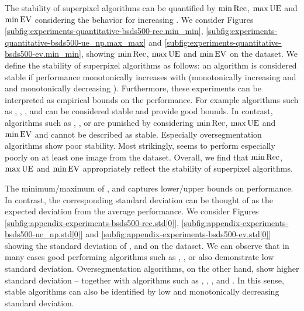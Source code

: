 The stability of superpixel algorithms can be quantified by $\min\text{Rec}$, $\max\text{UE}$ and $\min\text{EV}$ considering the behavior for increasing \K.
We consider Figures \ref{subfig:experiments-quantitative-bsds500-rec.min_min}, \ref{subfig:experiments-quantitative-bsds500-ue_np.max_max}
and \ref{subfig:experiments-quantitative-bsds500-ev.min_min},
showing $\min\text{Rec}$, $\max\text{UE}$ and $\min\text{EV}$ on the \BSDS dataset. We define the stability of superpixel algorithms
as follows: an algorithm is considered stable if performance monotonically increases with \K
(\ie monotonically increasing \Rec and \EV and monotonically decreasing \UE).
Furthermore, these experiments can be interpreted as empirical bounds on the performance.
For example algorithms such as \ETPSr, \ERGCr, \ERSr, \CRSr and \SLICr can be considered stable and provide good bounds.
In contrast, algorithms such as \EAMSr, \FHr, \VCr or \POISEr are punished by
considering $\min\text{Rec}$, $\max\text{UE}$ and $\min\text{EV}$ and cannot be described as stable.
Especially oversegmentation algorithms show poor stability. Most strikingly,
\EAMS seems to perform especially poorly on at least one image from the \BSDS dataset.
Overall, we find that $\min\text{Rec}$, $\max\text{UE}$ and $\min\text{EV}$ appropriately reflect
the stability of superpixel algorithms.

The minimum/maximum of \Rec, \UE and \EV captures lower/upper bounds on performance.
In contrast, the corresponding standard deviation can be thought of as the expected
deviation from the average performance.
We consider Figures \ref{subfig:appendix-experiments-bsds500-rec.std[0]},
\ref{subfig:appendix-experiments-bsds500-ue_np.std[0]} and \ref{subfig:appendix-experiments-bsds500-ev.std[0]}
showing the standard deviation of \Rec, \UE and \EV on the \BSDS dataset.
We can observe that in many cases good performing algorithms such as \ETPS, \CRS, \SLIC or \ERS
also demonstrate low standard deviation. Oversegmentation algorithms, on the other hand, show higher standard deviation
-- together with algorithms such as \PF, \TPS, \VC, \CIS and \SEAW.
In this sense, stable algorithms can also be identified by low and monotonically decreasing standard deviation.

